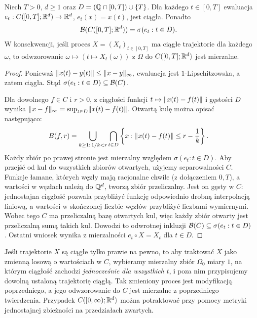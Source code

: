 \begin{twierdzenie}
Niech $T>0$, $d\ge1$ oraz
$D=(\mathbb{Q}\cap[0,T])\cup\{T\}$.
Dla każdego $t\in[0,T]$ ewaluacja
$e_t:C([0,T];\mathbb{R}^d)\to\mathbb{R}^d$, $e_t(x)=x(t)$,
jest ciągła. Ponadto
\[
\mathcal{B}(C([0,T];\mathbb{R}^d))=\sigma(e_t:t\in D).
\]
W konsekwencji, jeśli proces $X=(X_t)_{t\in[0,T]}$
ma ciągłe trajektorie dla każdego $\omega$, to odwzorowanie
$\omega\mapsto(t\mapsto X_t(\omega))$ z $\Omega$ do
$C([0,T];\mathbb{R}^d)$ jest mierzalne.
\end{twierdzenie}
\begin{proof}
Ponieważ $\lVert x(t)-y(t)\rVert\le\lVert x-y\rVert_\infty$,
ewaluacja jest $1$-Lipschitzowska, a zatem ciągła.
Stąd $\sigma(e_t:t\in D)\subseteq\mathcal{B}(C)$.

Dla dowolnego $f\in C$ i $r>0$, z ciągłości funkcji
$t\mapsto\lVert x(t)-f(t)\rVert$ i gęstości $D$ wynika
$\lVert x-f\rVert_\infty=\sup_{t\in D}\lVert x(t)-f(t)\rVert$.
Otwartą kulę można opisać następująco:
\[
B(f,r)=\bigcup_{k\ge1:\,1/k<r}
\bigcap_{t\in D}
\left\{x:\lVert x(t)-f(t)\rVert\le r-\frac1k\right\}.
\]
Każdy zbiór po prawej stronie jest mierzalny względem
$\sigma(e_t:t\in D)$. Aby przejść od kul do wszystkich
zbiorów otwartych, użyjemy separowalności $C$.
Funkcje łamane, których węzły mają racjonalne chwile
(z dołączeniem $0,T$), a wartości w węzłach należą do
$\mathbb{Q}^d$, tworzą zbiór przeliczalny. Jest on gęsty w
$C$: jednostajna ciągłość pozwala przybliżyć funkcję
odpowiednio drobną interpolacją liniową, a wartości
w skończonej liczbie węzłów przybliżyć liczbami wymiernymi.
Wobec tego $C$ ma przeliczalną bazę otwartych kul,
więc każdy zbiór otwarty jest przeliczalną sumą takich kul.
Dowodzi to odwrotnej inkluzji $\mathcal{B}(C)\subseteq\sigma(e_t:t\in D)$.
Ostatni wniosek wynika z mierzalności $e_t\circ X=X_t$
dla $t\in D$.
\end{proof}

\begin{uwaga}
Jeśli trajektorie $X$ są ciągłe tylko prawie na pewno,
to aby traktować $X$ jako zmienną losową o wartościach w $C$,
wybieramy mierzalny zbiór $\Omega_0$ miary $1$, na którym
ciągłość zachodzi \emph{jednocześnie dla wszystkich $t$},
i poza nim przypisujemy dowolną ustaloną trajektorię ciągłą.
Tak zmieniony proces jest modyfikacją poprzedniego, a jego
odwzorowanie do $C$ jest mierzalne z poprzedniego twierdzenia.
Przypadek $C([0,\infty);\mathbb{R}^d)$ można potraktować przy pomocy
metryki jednostajnej zbieżności na przedziałach zwartych.
\end{uwaga}



